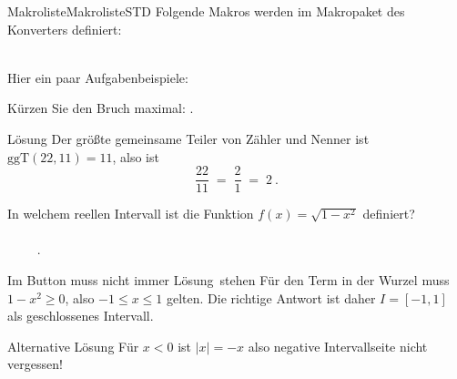 \begin{MXContent}{Makroliste}{Makroliste}{STD}
Folgende Makros werden im Makropaket des Konverters definiert:
\ \\ \ \\
\end{MXContent}

\begin{MExercises}

Hier ein paar Aufgabenbeispiele:

\begin{MExercise}
Kürzen Sie den Bruch maximal: \: .
\begin{MHint}{Lösung}
Der größte gemeinsame Teiler von Zähler und Nenner ist $\textrm{ggT}(22,11)=11$, also ist
$$
\frac{22}{11} \;=\; \frac{2}{1} \;=\; 2\: .
$$
\end{MHint}
\end{MExercise}

\begin{MExercise}
    In welchem reellen Intervall ist die Funktion $f(x)=\sqrt{1-x^2}$ definiert?
    \ \\ \ \\
    \ \ \ \ \: .
    \ \\
    \begin{MHint}{Im Button muss nicht immer \glqq Lösung\grqq\ stehen}
        Für den Term in der Wurzel muss $1-x^2\geq 0$, also $-1\leq x\leq 1$ gelten.
        Die richtige Antwort ist daher $I=[-1,1]$ als geschlossenes Intervall.
    \end{MHint}
    \begin{MHint}{Alternative Lösung}
        Für $x<0$ ist $|x|=-x$ also negative Intervallseite nicht vergessen!
    \end{MHint}
\end{MExercise}





\end{MExercises}


